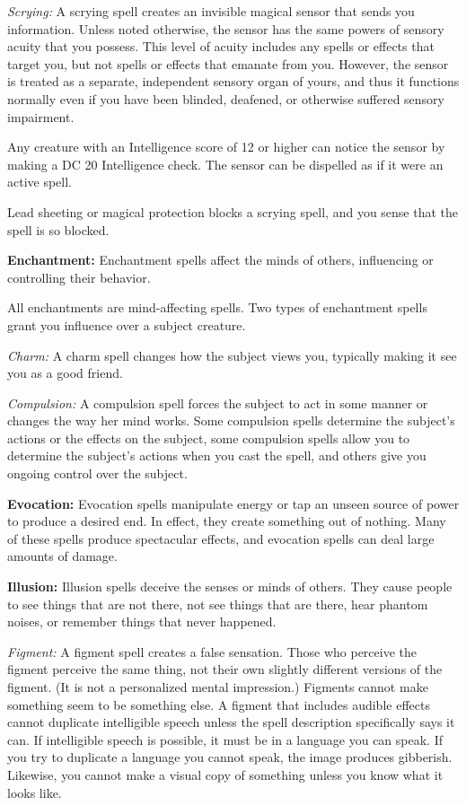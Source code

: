 \textit{Scrying:} A scrying spell creates an invisible magical sensor that sends you information. Unless noted otherwise, the sensor has the same powers of sensory acuity that you possess. This level of acuity includes any spells or effects that target you, but not spells or effects that emanate from you. However, the sensor is treated as a separate, independent sensory organ of yours, and thus it functions normally even if you have been blinded, deafened, or otherwise suffered sensory impairment.

Any creature with an Intelligence score of 12 or higher can notice the sensor by making a DC 20 Intelligence check. The sensor can be dispelled as if it were an active spell.

Lead sheeting or magical protection blocks a scrying spell, and you sense that the spell is so blocked.

\textbf{Enchantment:} Enchantment spells affect the minds of others, influencing or controlling their behavior.

All enchantments are mind-affecting spells. Two types of enchantment spells grant you influence over a subject creature.

\textit{Charm:} A charm spell changes how the subject views you, typically making it see you as a good friend.

\textit{Compulsion:} A compulsion spell forces the subject to act in some manner or changes the way her mind works. Some compulsion spells determine the subject's actions or the effects on the subject, some compulsion spells allow you to determine the subject's actions when you cast the spell, and others give you ongoing control over the subject.

\textbf{Evocation:} Evocation spells manipulate energy or tap an unseen source of power to produce a desired end. In effect, they create something out of nothing. Many of these spells produce spectacular effects, and evocation spells can deal large amounts of damage.

\textbf{Illusion:} Illusion spells deceive the senses or minds of others. They cause people to see things that are not there, not see things that are there, hear phantom noises, or remember things that never happened.

\textit{Figment:} A figment spell creates a false sensation. Those who perceive the figment perceive the same thing, not their own slightly different versions of the figment. (It is not a personalized mental impression.) Figments cannot make something seem to be something else. A figment that includes audible effects cannot duplicate intelligible speech unless the spell description specifically says it can. If intelligible speech is possible, it must be in a language you can speak. If you try to duplicate a language you cannot speak, the image produces gibberish. Likewise, you cannot make a visual copy of something unless you know what it looks like.

